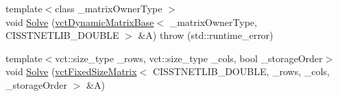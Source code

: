 {\bf }\par
\begin{DoxyCompactItemize}
\item 
{\footnotesize template$<$class \-\_\-matrix\-Owner\-Type $>$ }\\void \hyperlink{classnmr_s_v_d_solver_a8f0a70263a6d3970948ca42f8fb6fb65}{Solve} (\hyperlink{classvct_dynamic_matrix_base}{vct\-Dynamic\-Matrix\-Base}$<$ \-\_\-matrix\-Owner\-Type, C\-I\-S\-S\-T\-N\-E\-T\-L\-I\-B\-\_\-\-D\-O\-U\-B\-L\-E $>$ \&A)  throw (std\-::runtime\-\_\-error)
\item 
{\footnotesize template$<$vct\-::size\-\_\-type \-\_\-rows, vct\-::size\-\_\-type \-\_\-cols, bool \-\_\-storage\-Order$>$ }\\void \hyperlink{classnmr_s_v_d_solver_ad8da94721572ce9dd279873f4934667e}{Solve} (\hyperlink{classvct_fixed_size_matrix}{vct\-Fixed\-Size\-Matrix}$<$ C\-I\-S\-S\-T\-N\-E\-T\-L\-I\-B\-\_\-\-D\-O\-U\-B\-L\-E, \-\_\-rows, \-\_\-cols, \-\_\-storage\-Order $>$ \&A)
\end{DoxyCompactItemize}

